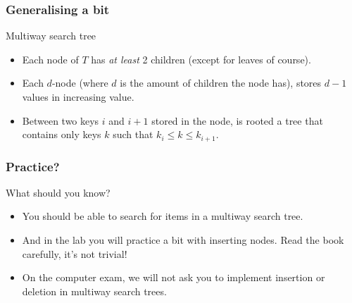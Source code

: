 \begin{frame}
	\frametitle{Generalising a bit}
		\begin{block}{Multiway search tree}
			\begin{itemize}
				\item Each node of $T$ has \textit{at least} 2 children (except for leaves of course).
				\item Each $d$-node (where $d$ is the amount of children the node has), stores $d-1$ values in increasing value.
				\item Between two keys $i$ and $i+1$ stored in the node, is rooted a tree that contains only keys $k$ such that
					$k_i \leq k \leq k_{i+1}$.
			\end{itemize}
			
		\end{block}	

	
\end{frame}

\begin{frame}
	\frametitle{Practice?}
	
		\begin{block}{What should you know?}
			\begin{itemize}
				\item You should be able to search for items in a multiway search tree.
				\item And in the lab you will practice a bit with inserting nodes. Read the book carefully, it's not trivial!
				\item On the computer exam, we will not ask you to implement insertion or deletion in multiway search trees.
			\end{itemize}
		\end{block}	
\end{frame}


